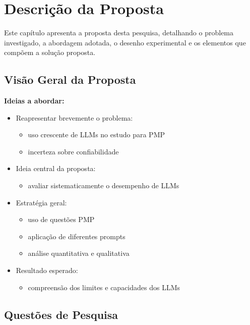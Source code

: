 \chapter{Descrição da Proposta}
\label{sec:metodologia}

Este capítulo apresenta a proposta desta pesquisa, detalhando o problema investigado, a abordagem adotada, o desenho experimental e os elementos que compõem a solução proposta.

\section{Visão Geral da Proposta}
\label{subsec:visao_proposta}

\textbf{Ideias a abordar:}
\begin{itemize}
    \item Reapresentar brevemente o problema:
    \begin{itemize}
        \item uso crescente de LLMs no estudo para PMP
        \item incerteza sobre confiabilidade
    \end{itemize}
    \item Ideia central da proposta:
    \begin{itemize}
        \item avaliar sistematicamente o desempenho de LLMs
    \end{itemize}
    \item Estratégia geral:
    \begin{itemize}
        \item uso de questões PMP
        \item aplicação de diferentes prompts
        \item análise quantitativa e qualitativa
    \end{itemize}
    \item Resultado esperado:
    \begin{itemize}
        \item compreensão dos limites e capacidades dos LLMs
    \end{itemize}
\end{itemize}




\section{Questões de Pesquisa}
\label{subsec:qp_proposta}


